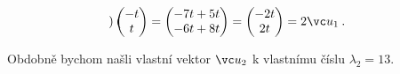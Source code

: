 \begin{example}
\begin{align}
\begin{pmatrix}
        \end{pmatrix}
        \begin{pmatrix}
            -t \\ t
        \end{pmatrix}
        =
        \begin{pmatrix}
            -7t+5t \\ -6t+8t
        \end{pmatrix}
        =
        \begin{pmatrix}
            -2t \\ 2t
        \end{pmatrix}
        = 2 \vc u_1 \:.
    \end{align}

    Obdobně bychom našli vlastní vektor $\vc u_2$ k vlastnímu číslu $\lambda_2 = 13$.
\end{example}